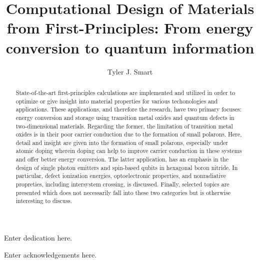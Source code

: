 \documentclass[12pt]{../include/ucthesis}
\begin{document}
\title{Computational Design of Materials from First-Principles: From energy conversion to quantum information}
\author{Tyler J. Smart}
\deanlinethree{}

\begin{frontmatter}
\maketitle

\copyrightpage

\tableofcontents

\listoffigures

\listoftables

\begin{abstract}
    State-of-the-art first-principles calculations are implemented and utilized in order to optimize or give insight into material properties for various techonologies and applications. These applications, and therefore the research, have two primary focuses: energy conversion and storage using transition metal oxides and quantum defects in two-dimensional materials. Regarding the former, the limitation of transition metal oxides is in their poor carrier conduction due to the formation of small polarons. Here, detail and insight are given into the formation of small polarons, especially under atomic doping wherein doping can help to improve carrier conduction in these systems and offer better energy conversion. The latter application, has an emphasis in the design of single photon emitters and spin-based qubits in hexagonal boron nitride. In particular, defect ionization energies, optoelectronic properties, and nonradiative propreties, including intersystem crossing, is discussed. Finally, selected topics are presented which does not necessarily fall into these two categories but is otherwise interesting to discuss.
\end{abstract}

\begin{dedication}
\vspace*{\fill}
\begin{center}
Enter dedication here.
\end{center}
\vspace*{\fill}
\end{dedication}

\begin{acknowledgements}
Enter acknowledgements here.
\end{acknowledgements}

\end{frontmatter}
\end{document}
